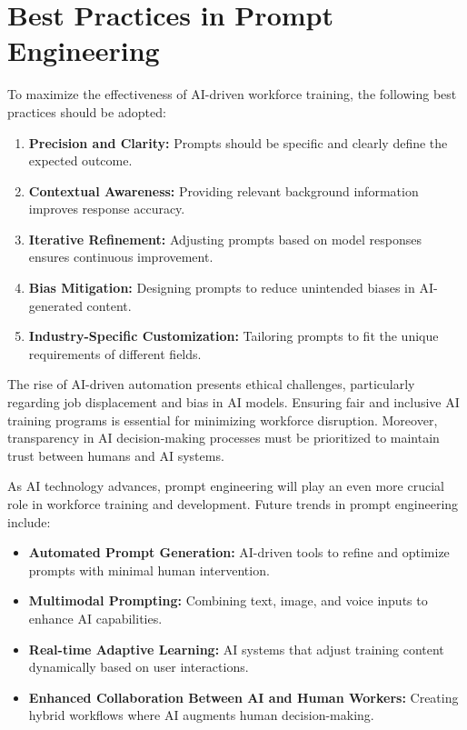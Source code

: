 \documentclass[a4paper,headinclude=on,footinclude=on,12pt,oneside]{scrbook}
\begin{document}
\section{Best Practices in Prompt Engineering}
To maximize the effectiveness of AI-driven workforce training, the following best practices should be adopted:
\begin{enumerate}
	\item \textbf{Precision and Clarity:} Prompts should be specific and clearly define the expected outcome.
	\item \textbf{Contextual Awareness:} Providing relevant background information improves response accuracy.
	\item \textbf{Iterative Refinement:} Adjusting prompts based on model responses ensures continuous improvement.
	\item \textbf{Bias Mitigation:} Designing prompts to reduce unintended biases in AI-generated content.
	\item \textbf{Industry-Specific Customization:} Tailoring prompts to fit the unique requirements of different fields.
\end{enumerate}

The rise of AI-driven automation presents ethical challenges, particularly regarding job displacement and bias in AI models. Ensuring fair and inclusive AI training programs is essential for minimizing workforce disruption. Moreover, transparency in AI decision-making processes must be prioritized to maintain trust between humans and AI systems.

As AI technology advances, prompt engineering will play an even more crucial role in workforce training and development. Future trends in prompt engineering include:
\begin{itemize}
	\item \textbf{Automated Prompt Generation:} AI-driven tools to refine and optimize prompts with minimal human intervention.
	\item \textbf{Multimodal Prompting:} Combining text, image, and voice inputs to enhance AI capabilities.
	\item \textbf{Real-time Adaptive Learning:} AI systems that adjust training content dynamically based on user interactions.
	\item \textbf{Enhanced Collaboration Between AI and Human Workers:} Creating hybrid workflows where AI augments human decision-making.
\end{itemize}
\end{document}
